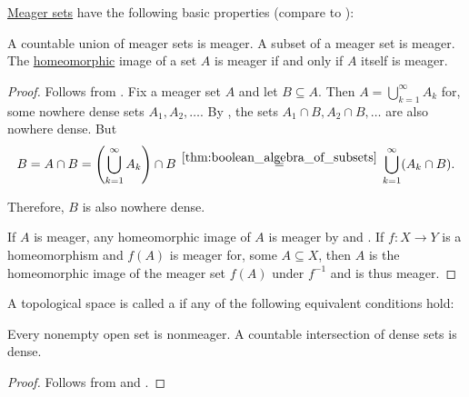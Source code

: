 \begin{proposition}\label{thm:meager_set_properties}
  \hyperref[def:meager_set]{Meager sets} have the following basic properties (compare to ):
  \begin{thmenum}
     A countable union of meager sets is meager.
     A subset of a meager set is meager.
     The \hyperref[def:homeomorphism]{homeomorphic} image of a set \( A \) is meager if and only if \( A \) itself is meager.
  \end{thmenum}
\end{proposition}
\begin{proof}
   Follows from .
   Fix a meager set \( A \) and let \( B \subseteq A \). Then \( A = \bigcup_{k=1}^\infty A_k \) for, some nowhere dense sets \( A_1, A_2, \ldots \). By , the sets \( A_1 \cap B, A_2 \cap B, \ldots \) are also nowhere dense. But
  \begin{equation*}
    B
    =
    A \cap B
    =
    \left(\bigcup_{k=1}^\infty A_k \right) \cap B
    \reloset {\ref{thm:boolean_algebra_of_subsets}} =
    \bigcup_{k=1}^\infty (A_k \cap B).
  \end{equation*}

  Therefore, \( B \) is also nowhere dense.

  \hfill
  \NecessitySubProof If \( A \) is meager, any homeomorphic image of \( A \) is meager by  and .
  \SufficiencySubProof If \( f: X \to Y \) is a homeomorphism and \( f(A) \) is meager for, some \( A \subseteq X \), then \( A \) is the homeomorphic image of the meager set \( f(A) \) under \( f^{-1} \) and is thus meager.
\end{proof}

\begin{definition}\label{def:baire_space}
  A topological space is called a  if any of the following equivalent conditions hold:
  \begin{thmenum}
     Every nonempty open set is nonmeager.
     A countable intersection of dense sets is dense.
  \end{thmenum}
\end{definition}
\begin{proof}
   Follows from  and .
\end{proof}

